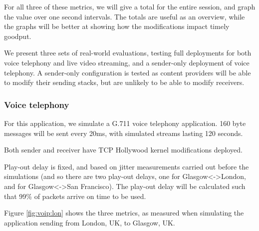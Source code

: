 For all three of these metrics, we will give a total for the entire session,
and graph the value over one second intervals. The totals are useful as an
overview, while the graphs will be better at showing how the modifications
impact timely goodput.

We present three sets of real-world evaluations, testing full deployments
for both voice telephony and live video streaming, and a sender-only
deployment of voice telephony. A sender-only configuration is tested as
content providers will be able to modify their sending stacks, but are
unlikely to be able to modify receivers.

\subsubsection{Voice telephony}

For this application, we simulate a G.711 voice telephony application.
160 byte messages will be sent every 20ms, with simulated streams lasting
120 seconds.

Both sender and receiver have TCP Hollywood kernel modifications deployed.

Play-out delay is fixed, and based on jitter measurements carried out
before the simulations (and so there are two play-out delays, one for
Glasgow<->London, and for Glasgow<->San Francisco). The play-out delay
will be calculated such that 99\% of packets arrive on time to be used.

\begin{figure*}[t]
	\hfill
	\hfill
	\centering
	\caption{Voice telephony (G.711) simulation from London, UK to Glasgow, UK - both TCP Hollywood hosts}
	\label{fig:voip:lon}
\end{figure*}

Figure \ref{fig:voip:lon} shows the three metrics, as measured when
simulating the application sending from London, UK, to Glasgow, UK.

\begin{figure*}[t]
	\centering
	\hfill
	\hfill
	\caption{Voice telephony (G.711) from San Francisco, UK to Glasgow, UK - both TCP Hollywood hosts}
	\label{fig:voip:sf}
\end{figure*}

